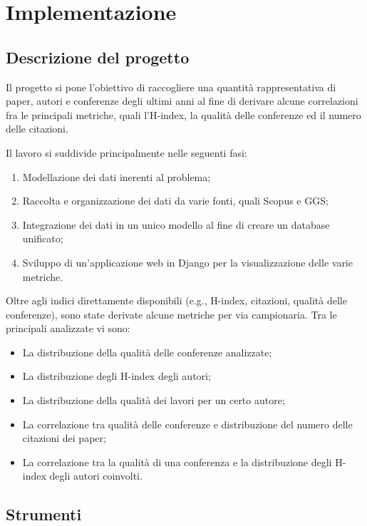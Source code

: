 \chapter{Implementazione}

\section{Descrizione del progetto}
\label{descrizione_progetto}

Il progetto si pone l'obiettivo di raccogliere una quantità rappresentativa
di paper, autori e conferenze degli ultimi anni al fine di derivare alcune
correlazioni fra le principali metriche, quali l'H-index, la qualità delle
conferenze ed il numero delle citazioni.

Il lavoro si suddivide principalmente nelle seguenti fasi:
\begin{enumerate}
  \item Modellazione dei dati inerenti al problema;
  \item Raccolta e organizzazione dei dati da varie fonti, quali Scopus e GGS;
  \item Integrazione dei dati in un unico modello al fine di creare un database unificato;
  \item Sviluppo di un'applicazione web in Django per la visualizzazione delle varie metriche.
\end{enumerate}

Oltre agli indici direttamente disponibili (e.g., H-index, citazioni, qualità
delle conferenze), sono state derivate alcune metriche per via campionaria.
Tra le principali analizzate vi sono:
\begin{itemize}
  \item La distribuzione della qualità delle conferenze analizzate;
  \item La distribuzione degli H-index degli autori;
  \item La distribuzione della qualità dei lavori per un certo autore;
  \item La correlazione tra qualità delle conferenze e distribuzione del numero delle citazioni dei paper;
  \item La correlazione tra la qualità di una conferenza e la distribuzione degli H-index degli autori coinvolti.
\end{itemize}

\section{Strumenti}

